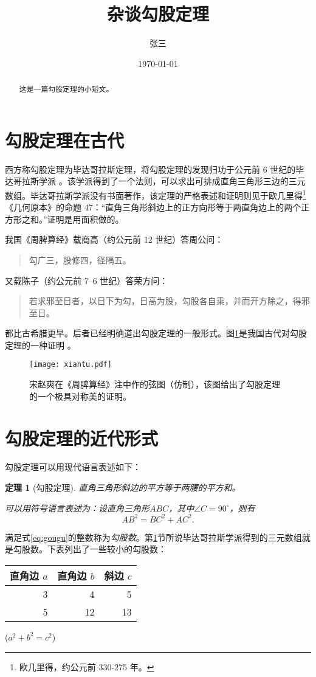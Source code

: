 \documentclass[UTF8]{ctexart}
\title{\heiti 杂谈勾股定理}
\author{\kaishu 张三}
\date{\today}
\newtheorem{thm}{定理}
\newenvironment{myquote}{\begin{quote}\zihao{-5}\kaishu}{\end{quote}}	%
\newcommand\degree{^\circ}
\begin{document}
 
	\maketitle
	
	\begin{abstract}
		这是一篇勾股定理的小短文。
	\end{abstract}
 
	\tableofcontents
 
	\section{勾股定理在古代}\label{sec:first}
	西方称勾股定理为毕达哥拉斯定理，将勾股定理的发现归功于公元前 6 世纪的毕达哥拉斯学派 \cite{kline}。该学派得到了一个法则，可以求出可排成直角三角形三边的三元数组。毕达哥拉斯学派没有书面著作，该定理的严格表述和证明则见于欧几里得\footnote{欧几里得，约公元前 330-275 年。}《几何原本》的命题 47：“直角三角形斜边上的正方向形等于两直角边上的两个正方形之和。”证明是用面积做的。
	
	我国《周脾算经》载商高（约公元前 12 世纪）答周公问：
	\begin{myquote}
		勾广三，股修四，径隅五。
	\end{myquote}
	又载陈子（约公元前 7--6 世纪）答荣方问：
	\begin{myquote} 
		若求邪至日者，以日下为勾，日高为股，勾股各自乘，并而开方除之，得邪至日。
	\end{myquote}
	都比古希腊更早。后者已经明确道出勾股定理的一般形式。图\ref{fig:xiantu}是我国古代对勾股定理的一种证明 \cite{quanjing}。
	\begin{figure}[ht] 
		\centering
		\texttt{[image: xiantu.pdf]}
		\caption{宋赵爽在《周脾算经》注中作的弦图（仿制），该图给出了勾股定理的一个极具对称美的证明。}
		\label{fig:xiantu}
	\end{figure}
	
	
	\section{勾股定理的近代形式}
	勾股定理可以用现代语言表述如下：
	\begin{thm}[勾股定理]
		直角三角形斜边的平方等于两腰的平方和。
		
		可以用符号语言表述为：设直角三角形$ABC$，其中$\angle C=90\degree$，则有
		\begin{equation}\label{eq:gougu}
			AB^2 = BC^2 + AC^2.
		\end{equation}
	\end{thm}
 
	满足式\eqref{eq:gougu}的整数称为\emph{勾股数}。第\ref{sec:first}节所说毕达哥拉斯学派得到的三元数组就是勾股数。下表列出了一些较小的勾股数：
	\begin{table}[H]
		\begin{tabular}{|rrr|}
			\hline
			直角边 $a$ & 直角边 $b$ & 斜边 $c$ \\
			\hline
			3    & 4    & 5   \\
			5    & 12   & 13 \\
			\hline
		\end{tabular}%
	\qquad
	($a^2 + b^2 = c^2$)
	\end{table}
 
	\nocite{Shiye}
	
\end{document}

